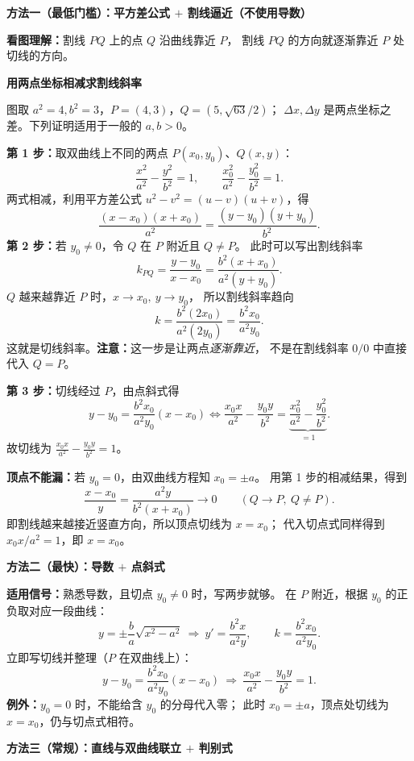 \clearpage
\begin{proofbox}
\textbf{方法一（最低门槛）：平方差公式 $+$ 割线逼近（不使用导数）}

\textbf{看图理解：}割线 $PQ$ 上的点 $Q$ 沿曲线靠近 $P$，
割线 $PQ$ 的方向就逐渐靠近 $P$ 处切线的方向。
\begin{center}
\textbf{用两点坐标相减求割线斜率}\par\medskip

\end{center}
图取 $a^2=4,b^2=3$，$P=(4,3)$，$Q=(5,\sqrt{63}/2)$；
$\Delta x,\Delta y$ 是两点坐标之差。下列证明适用于一般的 $a,b>0$。

\textbf{第 1 步：}取双曲线上不同的两点 $P(x_0,y_0)$、$Q(x,y)$：
\[
\frac{x^2}{a^2}-\frac{y^2}{b^2}=1,\qquad
\frac{x_0^2}{a^2}-\frac{y_0^2}{b^2}=1.
\]
两式相减，利用平方差公式 $u^2-v^2=(u-v)(u+v)$，得
\[
\frac{(x-x_0)(x+x_0)}{a^2}
=\frac{(y-y_0)(y+y_0)}{b^2}.
\]
\textbf{第 2 步：}若 $y_0\ne0$，令 $Q$ 在 $P$ 附近且 $Q\ne P$。
此时可以写出割线斜率
\[
 k_{PQ}=\frac{y-y_0}{x-x_0}
 =\frac{b^2(x+x_0)}{a^2(y+y_0)}.
\]
$Q$ 越来越靠近 $P$ 时，$x\to x_0,\ y\to y_0$，
所以割线斜率趋向
\[
 k=\frac{b^2(2x_0)}{a^2(2y_0)}
 =\boxed{\frac{b^2x_0}{a^2y_0}}.
\]
这就是切线斜率。\textbf{注意：}这一步是让两点\emph{逐渐靠近}，
不是在割线斜率 $0/0$ 中直接代入 $Q=P$。

\textbf{第 3 步：}切线经过 $P$，由点斜式得
\[
 y-y_0=\frac{b^2x_0}{a^2y_0}(x-x_0)
 \iff
 \frac{x_0x}{a^2}-\frac{y_0y}{b^2}
 =\underbrace{\frac{x_0^2}{a^2}-\frac{y_0^2}{b^2}}_{=1}.
\]
故切线为 $\boxed{\frac{x_0x}{a^2}-\frac{y_0y}{b^2}=1}$。

\textbf{顶点不能漏：}若 $y_0=0$，由双曲线方程知 $x_0=\pm a$。
用第 1 步的相减结果，得到
\[
 \frac{x-x_0}{y}=\frac{a^2y}{b^2(x+x_0)}\longrightarrow0
 \qquad (Q\to P,\ Q\ne P).
\]
即割线越来越接近竖直方向，所以顶点切线为 $x=x_0$；
代入切点式同样得到 $x_0x/a^2=1$，即 $x=x_0$。

\medskip
\textbf{方法二（最快）：导数 $+$ 点斜式}

\textbf{适用信号：}熟悉导数，且切点 $y_0\ne0$ 时，写两步就够。
在 $P$ 附近，根据 $y_0$ 的正负取对应一段曲线：
\[
 y=\pm\frac{b}{a}\sqrt{x^2-a^2}
 \ \Longrightarrow\ 
 y'=\frac{b^2x}{a^2y},\qquad
 k=\frac{b^2x_0}{a^2y_0}.
\]
立即写切线并整理（$P$ 在双曲线上）：
\[
 y-y_0=\frac{b^2x_0}{a^2y_0}(x-x_0)
 \ \Longrightarrow\ 
 \boxed{\frac{x_0x}{a^2}-\frac{y_0y}{b^2}=1}.
\]
\textbf{例外：}$y_0=0$ 时，不能给含 $y_0$ 的分母代入零；
此时 $x_0=\pm a$，顶点处切线为 $x=x_0$，仍与切点式相符。

\medskip
\textbf{方法三（常规）：直线与双曲线联立 $+$ 判别式}


\end{proofbox}
